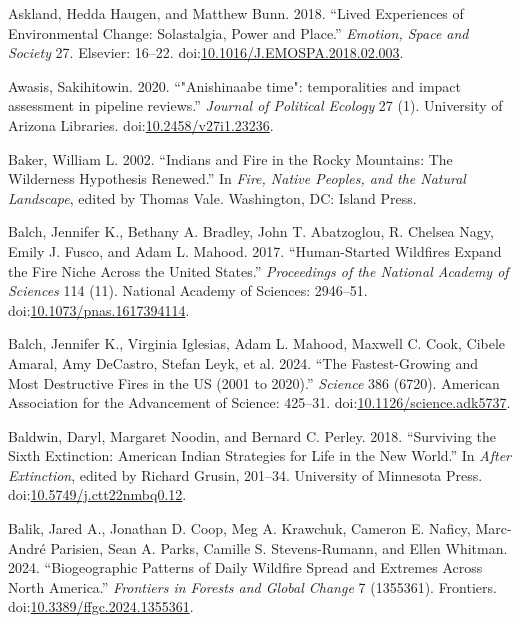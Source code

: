 \documentclass[
]{article}
\newlength{\cslhangindent}
\newenvironment{CSLReferences}[2] %
 {\begin{list}{}{%
  \setlength{\itemindent}{0pt}
  \setlength{\leftmargin}{0pt}
  \setlength{\parsep}{0pt}
  \ifodd #1
   \setlength{\leftmargin}{\cslhangindent}
   \setlength{\itemindent}{-1\cslhangindent}
  \fi
  \setlength{\itemsep}{#2\baselineskip}}}
 {\end{list}}
\begin{document}
\begin{CSLReferences}{1}{0}
Askland, Hedda Haugen, and Matthew Bunn. 2018. {``Lived Experiences of Environmental Change: {Solastalgia}, Power and Place.''} \emph{Emotion, Space and Society} 27. Elsevier: 16--22. doi:\href{https://doi.org/10.1016/J.EMOSPA.2018.02.003}{10.1016/J.EMOSPA.2018.02.003}.

Awasis, Sakihitowin. 2020. {``{"Anishinaabe time": temporalities and impact assessment in pipeline reviews}.''} \emph{Journal of Political Ecology} 27 (1). University of Arizona Libraries. doi:\href{https://doi.org/10.2458/v27i1.23236}{10.2458/v27i1.23236}.

Baker, William L. 2002. {``Indians and {Fire} in the {Rocky Mountains}: {The Wilderness Hypothesis Renewed}.''} In \emph{Fire, {Native Peoples}, and the {Natural Landscape}}, edited by Thomas Vale. Washington, DC: Island Press.

Balch, Jennifer K., Bethany A. Bradley, John T. Abatzoglou, R. Chelsea Nagy, Emily J. Fusco, and Adam L. Mahood. 2017. {``Human-Started Wildfires Expand the Fire Niche Across the {United States}.''} \emph{Proceedings of the National Academy of Sciences} 114 (11). National Academy of Sciences: 2946--51. doi:\href{https://doi.org/10.1073/pnas.1617394114}{10.1073/pnas.1617394114}.

Balch, Jennifer K., Virginia Iglesias, Adam L. Mahood, Maxwell C. Cook, Cibele Amaral, Amy DeCastro, Stefan Leyk, et al. 2024. {``The Fastest-Growing and Most Destructive Fires in the {US} (2001 to 2020).''} \emph{Science} 386 (6720). American Association for the Advancement of Science: 425--31. doi:\href{https://doi.org/10.1126/science.adk5737}{10.1126/science.adk5737}.

Baldwin, Daryl, Margaret Noodin, and Bernard C. Perley. 2018. {``Surviving the {Sixth Extinction}: {American Indian Strategies} for {Life} in the {New World}.''} In \emph{After {Extinction}}, edited by Richard Grusin, 201--34. University of Minnesota Press. doi:\href{https://doi.org/10.5749/j.ctt22nmbq0.12}{10.5749/j.ctt22nmbq0.12}.

Balik, Jared A., Jonathan D. Coop, Meg A. Krawchuk, Cameron E. Naficy, Marc-André Parisien, Sean A. Parks, Camille S. Stevens-Rumann, and Ellen Whitman. 2024. {``Biogeographic Patterns of Daily Wildfire Spread and Extremes Across {North America}.''} \emph{Frontiers in Forests and Global Change} 7 (1355361). Frontiers. doi:\href{https://doi.org/10.3389/ffgc.2024.1355361}{10.3389/ffgc.2024.1355361}.


\end{CSLReferences}
\end{document}
